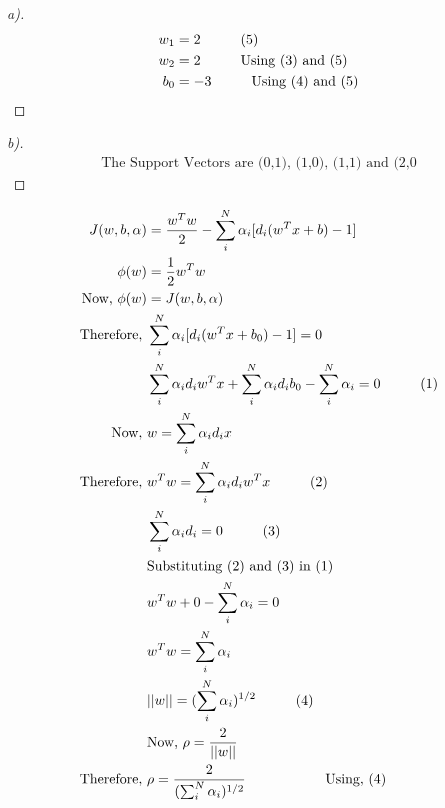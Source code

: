 \documentclass[12pt]{article}
\newenvironment{theorem}[2][Theorem]{\begin{trivlist}
\item[\hskip \labelsep {\bfseries #1}\hskip \labelsep {\bfseries #2.}]}{\end{trivlist}}
\begin{document}
\begin{theorem}[Ans]{4}
\begin{proof}[a)]
\begin{align*}
w_{1} &= 2  \hspace{10mm} (5)\\
w_{2}  &= 2  \hspace{10mm} \text{Using (3) and (5)}\\
b_{0} &= -3  \hspace{10mm} \text{Using (4) and (5)}\\
\end{align*}
\end{proof}
\begin{proof}[b)]
\begin{align*}
\text{The Support Vectors are (0,1), (1,0), (1,1) and (2,0}
\end{align*}
\end{proof}
\end{theorem}
\begin{theorem}[Ans]{5}
\begin{align*}
J(w,b,\alpha)  &= \frac{w^{T}w}{2} - \sum_{i}^{N}\alpha_{i}[d_{i} (w^{T}x+b)-1]\\
\phi(w) &= \frac{1}{2} w^{T}w\\
\text{Now, }\phi(w) &= J(w,b,\alpha)\\
\text{Therefore, }&\sum_{i}^{N}\alpha_{i}[d_{i} (w^{T}x+b_{0})-1] = 0\\
& \sum_{i}^{N}\alpha_{i}d_{i}w^{T}x+\sum_{i}^{N}\alpha_{i}d_{i}b_{0} - \sum_{i}^{N}\alpha_{i} = 0 \hspace{10mm} (1)\\
\text{Now, } &w = \sum_{i}^{N}\alpha_{i}d_{i}x\\
\text{Therefore, } &w^{T}w = \sum_{i}^{N}\alpha_{i}d_{i}w^{T}x \hspace{10mm} (2)\\
&\sum_{i}^{N}\alpha_{i}d_{i} = 0 \hspace{10mm} (3)\\
& \text{Substituting (2) and (3) in (1)}\\
 &w^{T}w + 0 - \sum_{i}^{N}\alpha_{i} = 0 \\
 &w^{T}w = \sum_{i}^{N}\alpha_{i}\\
 &||w|| = (\sum_{i}^{N}\alpha_{i})^{1/2} \hspace{10mm} (4)\\
 &\text{Now, }\rho = \frac{2}{||w||}\\
 \text{Therefore, }& \rho = \frac{2}{(\sum_{i}^{N}\alpha_{i})^{1/2}} \hspace{10mm} \hspace{10mm} \text{Using, }(4)
\end{align*}
\end{theorem}
\pagebreak

 
\end{document}
